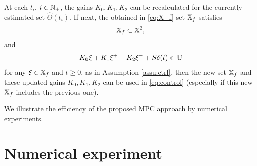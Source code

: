 \documentclass[letterpaper, 10 pt, conference]{ieeeconf}  %
\begin{document}
\begin{remark}
At each $t_{i}$, $i\in\mathbb{N}_{+}$, the gains $K_{0},K_{1},K_{2}$
can be recalculated for the currently estimated set $\hat{\Theta}(t_{i})$.
If next, the obtained in \eqref{eq:X_f} set $\mathbb{X}_{f}$ satisfies 
\[
\mathbb{X}_{f}\subset\mathbb{X}^{2},
\]
and
\[
K_{0}\xi+K_{1}\xi^{+}+K_{2}\xi^{-}+S\delta(t)\in\mathbb{U}
\]
for any $\xi\in\mathbb{X}_{f}$ and $t\geq0$, as in Assumption \ref{assu:ctrl},
then the new set $\mathbb{X}_{f}$ and these updated gains $K_{0},K_{1},K_{2}$
can be used in \eqref{eq:control} (especially if this new $\mathbb{X}_{f}$
includes the previous one).
\end{remark}

We illustrate the efficiency of the proposed MPC approach by numerical
experiments.

\section{\label{sec:experiments} Numerical experiment}
\end{document}

